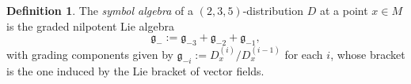 \documentclass[12pt,a4paper]{amsart}
\theoremstyle{definition}
\newtheorem{definition}[theorem]{Definition}
\begin{document}

\begin{definition}The \emph{symbol algebra} of a $(2,3,5)$-distribution $D$ at a point $x\in M$ is the graded %
nilpotent Lie algebra
\[\mathfrak{g}_-:=\mathfrak{g}_{-3}+\mathfrak{g}_{-2}+\mathfrak{g}_{-1},\]
with grading components given by $\mathfrak{g}_{-i}:=D^{(i)}_x/D^{(i-1)}_x$ for each $i$, whose bracket is the one induced by the Lie bracket of vector fields.\end{definition}
\end{document}
